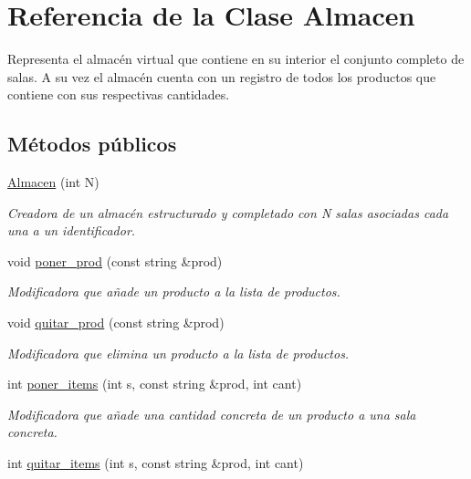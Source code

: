 \hypertarget{class_almacen}{}\section{Referencia de la Clase Almacen}
\label{class_almacen}


Representa el almacén virtual que contiene en su interior el conjunto completo de salas. A su vez el almacén cuenta con un registro de todos los productos que contiene con sus respectivas cantidades.  


\subsection*{Métodos públicos}
\begin{DoxyCompactItemize}
\item 
\hyperlink{class_almacen_ab6569f621c050df752fcdf5e1614631e}{Almacen} (int N)
\begin{DoxyCompactList}\small\item\em Creadora de un almacén estructurado y completado con N salas asociadas cada una a un identificador. \end{DoxyCompactList}\item 
void \hyperlink{class_almacen_a5ceb8f70af951fdd3c961e693fa2f53d}{poner\+\_\+prod} (const string \&prod)
\begin{DoxyCompactList}\small\item\em Modificadora que añade un producto a la lista de productos. \end{DoxyCompactList}\item 
void \hyperlink{class_almacen_a1899609156ebe6d1bca071dd4fea5eb2}{quitar\+\_\+prod} (const string \&prod)
\begin{DoxyCompactList}\small\item\em Modificadora que elimina un producto a la lista de productos. \end{DoxyCompactList}\item 
int \hyperlink{class_almacen_a0718beb9b0ed5272d030ac2c0b72364d}{poner\+\_\+items} (int s, const string \&prod, int cant)
\begin{DoxyCompactList}\small\item\em Modificadora que añade una cantidad concreta de un producto a una sala concreta. \end{DoxyCompactList}\item 
int \hyperlink{class_almacen_a16de14cab27a1789eeecc23abfeacc5a}{quitar\+\_\+items} (int s, const string \&prod, int cant)

\end{DoxyCompactItemize}
